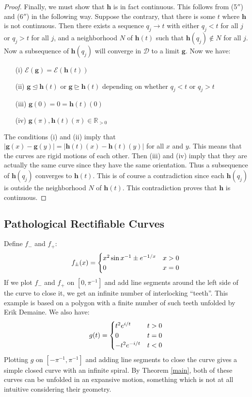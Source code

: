 \documentclass{amsart}
\newcommand{\R}			{\mathbb R}
\newcommand{\g}			{\mathbf g}
\newcommand{\h}			{\mathbf h}
\numberwithin{equation}{section}
\begin{document}
\begin{proof}
Finally, we must show that $\h$ is in fact continuous.  
This follows from (5$''$) and (6$''$) in the following way.  
Suppose the contrary, that there is some $t$ where 
$\h$ is not continuous.  Then there exists a sequence 
$q_j\to t$ with either $q_j<t$ for all $j$ or $q_j>t$ 
for all $j$, and a neighborhood $N$ of $\h(t)$ such that
$\h(q_j)\notin N$ for all $j$.  Now a subsequence of 
$\h(q_j)$ will converge in $\mathcal D$ to a limit $\g$.  
Now we have:
\begin{itemize}
\item[(i)] $\mathcal E(\g)=\mathcal E(\h(t))$
\item[(ii)] $\g\trianglelefteq\h(t)$ or $\g\trianglerighteq\h(t)$ 
depending on whether $q_j<t$ or $q_j>t$
\item[(iii)] $\g(0)=0=\h(t)(0)$
\item[(iv)] $\g(\pi),\h(t)(\pi)\in\R_{>0}$
\end{itemize}
The conditions (i) and (ii) imply 
that $|\g(x)-\g(y)|=|\h(t)(x)-\h(t)(y)|$ for 
all $x$ and $y$.  This means that the curves are 
rigid motions of each other.  Then (iii) and (iv) 
imply that they are actually the same 
curve since they have the same orientation.  Thus a 
subsequence of $\h(q_j)$ converges to $\h(t)$.  This 
is of course a contradiction since each $\h(q_j)$ 
is outside the neighborhood $N$ of $\h(t)$.  
This contradiction proves that $\h$ is continuous.
\end{proof}

\subsection{Pathological Rectifiable Curves}\label{path}

Define $f_-$ and $f_+$:
\begin{equation}
f_\pm(x)=\begin{cases}x^2\sin x^{-1}\pm e^{-1/x}&x>0\cr 0&x=0\end{cases}
\end{equation}
If we plot $f_-$ and $f_+$ on $[0,\pi^{-1}]$ and add 
line segments around the left side of the curve to close 
it, we get an infinite number of interlocking ``teeth''.  
This example is based on a polygon with a finite number 
of such teeth unfolded by Erik Demaine.  We also have:
\begin{equation}
g(t)=\begin{cases}t^2e^{i/t}&t>0\cr 0&t=0\cr-t^2e^{-i/t}&t<0\end{cases}
\end{equation}
Plotting $g$ on $[-\pi^{-1},\pi^{-1}]$ and adding line 
segments to close the curve gives a simple closed curve 
with an infinite spiral.  By Theorem \ref{main}, 
both of these curves can be unfolded in an expansive 
motion, something which is not at all intuitive considering 
their geometry.
\end{document}
